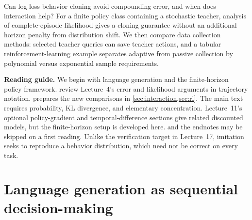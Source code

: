 \documentclass[11pt,twoside]{article}
\theoremstyle{definition}
\theoremstyle{remark}
\begin{document}
\begin{center}
\end{center}

Can log-loss behavior cloning avoid compounding error, and when does
interaction help? For a finite policy class containing a stochastic teacher,
analysis of complete-episode likelihood gives a cloning guarantee without an
additional horizon penalty from distribution shift. We then compare data
collection methods: selected teacher queries can save teacher actions, and a
tabular reinforcement-learning example separates adaptive from passive
collection by polynomial versus exponential sample requirements.

\noindent\textbf{Reading guide.}
We begin with language generation and the finite-horizon policy framework.
 review Lecture~4's error and likelihood
arguments in trajectory notation.  prepares the new
comparisons in \cref{sec:interaction,sec:rl}. The main text requires
probability, KL divergence, and elementary concentration. Lecture~11's
optional policy-gradient and temporal-difference sections give related
discounted models, but the finite-horizon setup is developed here.
 and the endnotes may be skipped on a first reading.
Unlike the verification target in Lecture~17, imitation seeks to reproduce
a behavior distribution, which need not be correct on every task.

\section{Language generation as sequential decision-making}
\label{sec:language}
\end{document}
